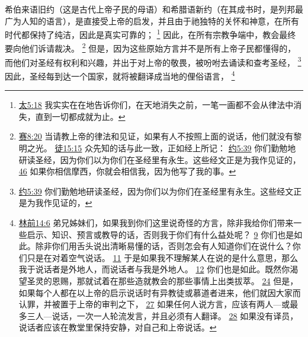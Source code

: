 \documentclass[12pt, a4paper, oneside]{ctexart}
\newcounter{parnum}[section]
\newcommand{\N}{%
   \noindent\refstepcounter{parnum}%
    \makebox[\parindent][l]{\textbf{\arabic{parnum}.}}}
\begin{document}
\N 希伯来语旧约（这是古代上帝子民的母语）和希腊语新约（在其成书时，是列邦最广为人知的语言），是直接受上帝的启发，并且由于祂独特的关怀和神意，在所有时代都保持了纯洁，因此是真实可靠的；
	\footnote {
		\href{https://biblehub.com/matthew/5-18.htm}{太5:18} 我实实在在地告诉你们，在天地消失之前，一笔一画都不会从律法中消失，直到一切都成就为止。
	}
	因此，在所有宗教争端中，教会最终要向他们诉请裁决。
	\footnote {
		\href{https://biblehub.com/isaiah/8-20.htm}{赛8:20} 当请教上帝的律法和见证，如果有人不按照上面的说话，他们就没有黎明之光。
		\href{https://biblehub.com/acts/15-15.htm}{徒15:15} 众先知的话与此一致，正如经上所记：
		\href{https://biblehub.com/john/5-39.htm}{约5:39} 你们勤勉地研读圣经，因为你们以为你们在圣经里有永生。这些经文正是为我作见证的，
		\href{https://biblehub.com/john/5-46.htm}{46} 如果你相信摩西，你就会相信我，因为他写了我的事。
	}
	但是，因为这些原始方言并不是所有上帝子民都懂得的，而他们对圣经有权利和兴趣，并出于对上帝的敬畏，被吩咐去诵读和查考圣经，
	\footnote {
		\href{https://biblehub.com/john/5-39.htm}{约5:39} 你们勤勉地研读圣经，因为你们以为你们在圣经里有永生。这些经文正是为我作见证的，
	}
	因此，圣经每到达一个国家，就将被翻译成当地的俚俗语言，
	\footnote {
		\href{https://biblehub.com/1_corinthians/14-6.htm}{林前14:6} 弟兄姊妹们，如果我到你们这里说奇怪的方言，除非我给你们带来一些启示、知识、预言或教导的话，否则我于你们有什么益处呢？
		\href{https://biblehub.com/1_corinthians/14-9.htm}{9} 你们也是如此。除非你们用舌头说出清晰易懂的话，否则怎会有人知道你们在说什么？你们只是在对着空气说话。
		\href{https://biblehub.com/1_corinthians/14-11.htm}{11} 于是如果我不理解某人在说的是什么意思，那么我于说话者是外地人，而说话者与我是外地人。
		\href{https://biblehub.com/1_corinthians/14-12.htm}{12} 你们也是如此。既然你渴望圣灵的恩赐，那就试着在那些造就教会的那些事情上出类拔萃。
		\href{https://biblehub.com/1_corinthians/14-24.htm}{24} 但是，如果每个人都在以上帝的启示说话时有异教徒或慕道者进来，他们就因大家而认罪，并被置于上帝的审判之下，
		\href{https://biblehub.com/1_corinthians/14-27.htm}{27} 如果任何人说方言，应该有两人---或最多三人---说话，一次一人轮流发言，并且必须有人翻译。
		\href{https://biblehub.com/1_corinthians/14-28.htm}{28} 如果没有译员，说话者应该在教堂里保持安静，对自己和上帝说话。
	}
\end{document}
